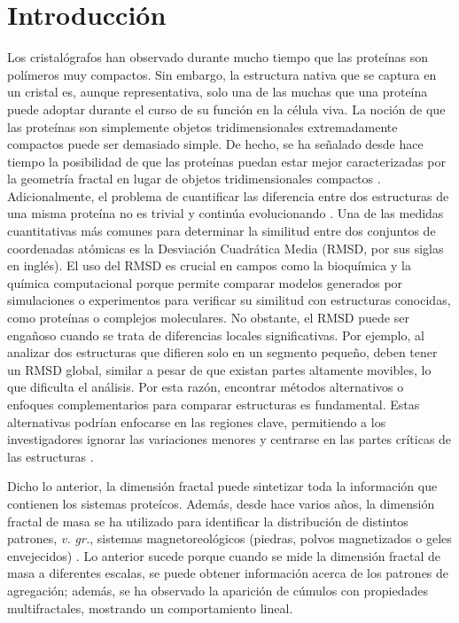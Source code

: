 \documentclass[11pt]{article}
\begin{document}
\clearpage

\section{Introducci\'{o}n}

Los cristal\'{o}grafos han observado durante mucho tiempo que las prote\'{i}nas son pol\'{i}meros muy compactos. Sin embargo, la estructura nativa que se captura en un cristal es, aunque representativa, solo  una de las muchas que una prote\'{i}na puede adoptar durante el curso de su funci\'{o}n en la c\'{e}lula viva. La noci\'{o}n de que las prote\'{i}nas son simplemente objetos tridimensionales extremadamente compactos puede ser demasiado simple. De hecho, se ha señalado desde hace tiempo la posibilidad de que las prote\'{i}nas puedan estar mejor caracterizadas por la geometr\'{i}a fractal en lugar de objetos tridimensionales compactos \cite{Enright2005}. Adicionalmente, el problema de cuantificar las diferencia entre dos estructuras de una misma prote\'{i}na no es trivial y contin\'{u}a evolucionando \cite{Kufareva2012}. Una de las medidas  cuantitativas m\'{a}s comunes para 
determinar la similitud entre dos conjuntos de coordenadas at\'{o}micas 
es la Desviaci\'{o}n Cuadr\'{a}tica Media 
(RMSD, por sus siglas en ingl\'{e}s). El uso del RMSD es crucial en campos como la bioqu\'{i}mica 
y la qu\'{i}mica computacional porque permite comparar modelos generados por 
simulaciones o experimentos para verificar su similitud con estructuras 
conocidas, como prote\'{i}nas o complejos moleculares. 
No obstante, el RMSD puede ser engañoso cuando se trata de diferencias
 locales significativas. Por ejemplo, al analizar dos estructuras que difieren solo 
 en un segmento pequeño, deben tener un RMSD global, similar a pesar de que existan partes
 altamente movibles, lo que dificulta el an\'{a}lisis. Por esta raz\'{o}n, encontrar
  m\'{e}todos alternativos o enfoques complementarios para comparar estructuras 
  es fundamental. Estas alternativas podr\'{i}an enfocarse en las regiones clave,
   permitiendo a los investigadores ignorar las variaciones menores y 
  centrarse en las partes cr\'{i}ticas de las estructuras \cite{Kufareva2012}.

Dicho lo anterior, la dimensi\'{o}n fractal puede sintetizar toda la informaci\'{o}n que contienen los sistemas prote\'{i}cos. Adem\'{a}s, desde hace varios años, la dimensi\'{o}n fractal de masa se ha utilizado para identificar la distribuci\'{o}n de distintos patrones, \textit{v. gr.}, sistemas magnetoreol\'{o}gicos (piedras, polvos magnetizados o geles envejecidos) \cite{Carrillo2003}. Lo anterior sucede porque cuando se mide la dimensi\'{o}n fractal de masa a diferentes escalas, se puede obtener  informaci\'{o}n acerca de los patrones de agregaci\'{o}n; adem\'{a}s, se ha observado la aparici\'{o}n de c\'{u}mulos  con propiedades multifractales, mostrando un comportamiento lineal.
\end{document}
